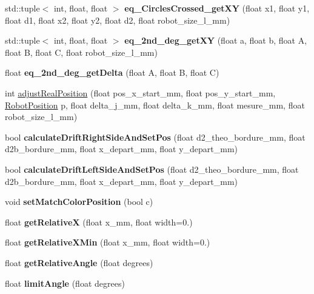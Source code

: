 \begin{DoxyCompactItemize}
std\+::tuple$<$ int, float, float $>$ {\bfseries eq\+\_\+Circles\+Crossed\+\_\+get\+XY} (float x1, float y1, float d1, float x2, float y2, float d2, float robot\+\_\+size\+\_\+l\+\_\+mm)
\item 
\mbox{\label{classAsserv_a744a8285ae7c6339252458a9c94fd602}} 
std\+::tuple$<$ int, float, float $>$ {\bfseries eq\+\_\+2nd\+\_\+deg\+\_\+get\+XY} (float a, float b, float A, float B, float C, float robot\+\_\+size\+\_\+l\+\_\+mm)
\item 
\mbox{\label{classAsserv_adb57afce5f18ec54425fcf5e8d54da75}} 
float {\bfseries eq\+\_\+2nd\+\_\+deg\+\_\+get\+Delta} (float A, float B, float C)
\item 
int \hyperlink{classAsserv_a1677fd20a9cb16f78c609951e073550e}{adjust\+Real\+Position} (float pos\+\_\+x\+\_\+start\+\_\+mm, float pos\+\_\+y\+\_\+start\+\_\+mm, \hyperlink{structRobotPosition}{Robot\+Position} p, float delta\+\_\+j\+\_\+mm, float delta\+\_\+k\+\_\+mm, float mesure\+\_\+mm, float robot\+\_\+size\+\_\+l\+\_\+mm)
\item 
\mbox{\label{classAsserv_a9e997a871e745e687a4088103378bae3}} 
bool {\bfseries calculate\+Drift\+Right\+Side\+And\+Set\+Pos} (float d2\+\_\+theo\+\_\+bordure\+\_\+mm, float d2b\+\_\+bordure\+\_\+mm, float x\+\_\+depart\+\_\+mm, float y\+\_\+depart\+\_\+mm)
\item 
\mbox{\label{classAsserv_a314e3ff9a8a538a23d26dcb802386024}} 
bool {\bfseries calculate\+Drift\+Left\+Side\+And\+Set\+Pos} (float d2\+\_\+theo\+\_\+bordure\+\_\+mm, float d2b\+\_\+bordure\+\_\+mm, float x\+\_\+depart\+\_\+mm, float y\+\_\+depart\+\_\+mm)
\item 
\mbox{\label{classAsserv_a1405746fd8b2486724eec8baf4e72f74}} 
void {\bfseries set\+Match\+Color\+Position} (bool c)
\item 
\mbox{\label{classAsserv_a7a7e84f37ab3d94c10bcfe0542f7c5ff}} 
float {\bfseries get\+RelativeX} (float x\+\_\+mm, float width=0.)
\item 
\mbox{\label{classAsserv_ac2c223c7a13318de135088a30efc076d}} 
float {\bfseries get\+Relative\+X\+Min} (float x\+\_\+mm, float width=0.)
\item 
\mbox{\label{classAsserv_a790f7ad183fe585a87cefb7ad5688ffe}} 
float {\bfseries get\+Relative\+Angle} (float degrees)
\item 
\mbox{\label{classAsserv_a2a48f3a3252a4311e96f20e2595febff}} 
float {\bfseries limit\+Angle} (float degrees)
\end{DoxyCompactItemize}
